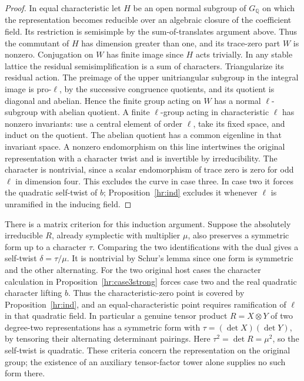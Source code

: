 \begin{proof}
In equal characteristic let \(H\) be an open normal subgroup of
\(G_{\mathbb Q}\) on which the representation becomes reducible
over an algebraic closure of the coefficient field. Its restriction
is semisimple by the sum-of-translates argument above. Thus the
commutant of \(H\) has dimension greater than one, and its trace-zero
part \(W\) is nonzero. Conjugation on \(W\) has finite image since
\(H\) acts trivially. In any stable lattice the residual
semisimplification is a sum of characters. Triangularize its
residual action. The preimage of the upper unitriangular subgroup
in the integral image is pro-\(\ell\), by the successive congruence
quotients, and its quotient is diagonal and abelian. Hence
the finite group acting on \(W\) has a normal \(\ell\)-subgroup
with abelian quotient. A finite \(\ell\)-group acting in characteristic
\(\ell\) has nonzero invariants: use a central element of order
\(\ell\), take its fixed space, and induct on the quotient.
The abelian quotient has a common eigenline in that invariant space.
A nonzero endomorphism on this line intertwines the original
representation with a character twist and is invertible by
irreducibility. The character is nontrivial, since a scalar
endomorphism of trace zero is zero for odd \(\ell\) in dimension
four. This excludes the curve in case three. In case two it forces
the quadratic self-twist of \(b\); Proposition~\ref{hr:ind}
excludes it whenever \(\ell\) is unramified in the inducing field.
\end{proof}

There is a matrix criterion for this induction argument. Suppose
the absolutely irreducible \(R\), already symplectic with multiplier
\(\mu\), also preserves a symmetric form up to a character \(\tau\).
Comparing the two identifications with the dual gives a self-twist
\(\delta=\tau/\mu\). It is nontrivial by Schur's lemma since one
form is symmetric and the other alternating. For the two original
host cases the character calculation in
Proposition~\ref{hr:case3strong} forces case two and the real
quadratic character lifting \(b\). Thus the characteristic-zero
point is covered by Proposition~\ref{hr:ind}, and an
equal-characteristic point requires ramification of \(\ell\) in
that quadratic field.
In particular a genuine tensor product \(R=X\otimes Y\) of two
degree-two representations has a symmetric form with
\(\tau=(\det X)(\det Y)\), by tensoring their alternating determinant
pairings. Here \(\tau^2=\det R=\mu^2\), so the self-twist is
quadratic. These criteria concern the representation on the
original group; the existence of an auxiliary tensor-factor
tower alone supplies no such form there.


